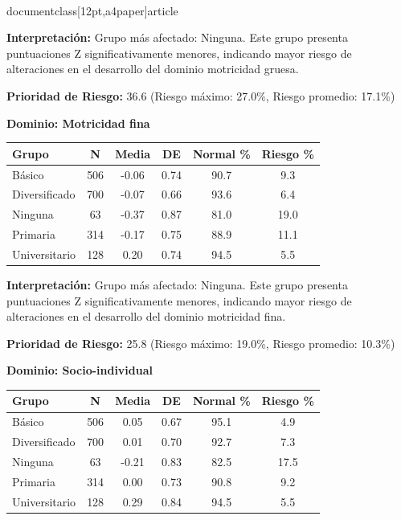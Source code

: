 \\documentclass[12pt,a4paper]{article}
\begin{document}
\textbf{Interpretación:} Grupo más afectado: Ninguna. Este grupo presenta puntuaciones Z significativamente menores, indicando mayor riesgo de alteraciones en el desarrollo del dominio motricidad gruesa.

\textbf{Prioridad de Riesgo:} 36.6 (Riesgo máximo: 27.0\%, Riesgo promedio: 17.1\%)


\vspace{0.5cm}


\textbf{Dominio: Motricidad fina}


\begin{center}
\begin{tabular}{|l|c|c|c|c|c|}
\hline
\textbf{Grupo} & \textbf{N} & \textbf{Media} & \textbf{DE} & \textbf{Normal \%} & \textbf{Riesgo \%} \\
\hline
Básico & 506 & -0.06 & 0.74 & 90.7 & 9.3 \\
Diversificado & 700 & -0.07 & 0.66 & 93.6 & 6.4 \\
Ninguna & 63 & -0.37 & 0.87 & 81.0 & 19.0 \\
Primaria & 314 & -0.17 & 0.75 & 88.9 & 11.1 \\
Universitario & 128 & 0.20 & 0.74 & 94.5 & 5.5 \\

\hline
\end{tabular}
\end{center}


\textbf{Interpretación:} Grupo más afectado: Ninguna. Este grupo presenta puntuaciones Z significativamente menores, indicando mayor riesgo de alteraciones en el desarrollo del dominio motricidad fina.

\textbf{Prioridad de Riesgo:} 25.8 (Riesgo máximo: 19.0\%, Riesgo promedio: 10.3\%)


\vspace{0.5cm}


\textbf{Dominio: Socio-individual}


\begin{center}
\begin{tabular}{|l|c|c|c|c|c|}
\hline
\textbf{Grupo} & \textbf{N} & \textbf{Media} & \textbf{DE} & \textbf{Normal \%} & \textbf{Riesgo \%} \\
\hline
Básico & 506 & 0.05 & 0.67 & 95.1 & 4.9 \\
Diversificado & 700 & 0.01 & 0.70 & 92.7 & 7.3 \\
Ninguna & 63 & -0.21 & 0.83 & 82.5 & 17.5 \\
Primaria & 314 & 0.00 & 0.73 & 90.8 & 9.2 \\
Universitario & 128 & 0.29 & 0.84 & 94.5 & 5.5 \\

\hline
\end{tabular}
\end{center}
\end{document}
